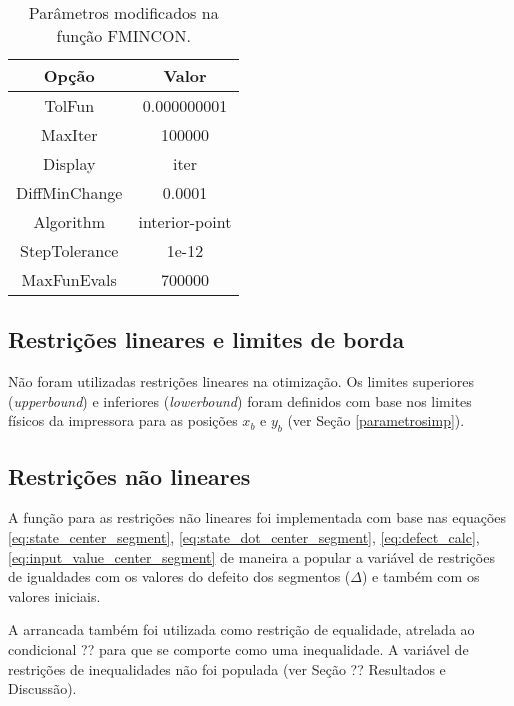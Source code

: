 \begin{table}
    \begin{center}
    \caption{Parâmetros modificados na função FMINCON.}
    \label{tab:fmincon_options}
    \begin{tabular}{c c}
        Opção & Valor \\ \hline
        TolFun & 0.000000001 \\
        MaxIter & 100000 \\
        Display & iter \\
        DiffMinChange & 0.0001 \\
        Algorithm & interior-point \\
        StepTolerance & 1e-12 \\
        MaxFunEvals & 700000  \\ \hline
    \end{tabular}
    \end{center}
\end{table}

\subsection{Restrições lineares e limites de borda}

Não foram utilizadas restrições lineares na otimização. Os limites superiores (\textit{upperbound}) e inferiores (\textit{lowerbound}) foram definidos com base nos limites físicos da impressora para as posições $x_b$ e $y_b$ (ver Seção \ref{parametrosimp}).

\subsection{Restrições não lineares}

A função para as restrições não lineares foi implementada com base nas equações \ref{eq:state_center_segment},
\ref{eq:state_dot_center_segment}, \ref{eq:defect_calc}, \ref{eq:input_value_center_segment} de maneira a
popular a variável de restrições de igualdades com os valores do defeito dos segmentos ($\Delta$) e também
com os valores iniciais. 

A arrancada também foi utilizada como restrição de equalidade, atrelada ao condicional ?? para que se comporte como uma inequalidade.
A variável de restrições de inequalidades não foi populada (ver Seção ?? Resultados e Discussão).


